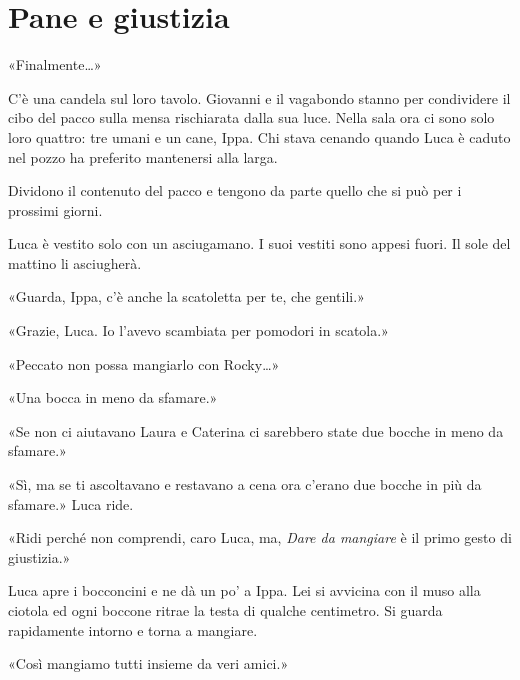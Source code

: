 \chapter{Pane e giustizia}

«Finalmente…»

\par\medskip
C’\`e una candela sul loro tavolo. Giovanni e il vagabondo stanno per condividere il cibo del pacco sulla mensa rischiarata dalla sua luce.
Nella sala ora ci sono solo loro quattro: tre umani e un cane, Ippa.
Chi stava cenando quando Luca \`e caduto nel pozzo ha preferito mantenersi alla larga.

\par\medskip
Dividono il contenuto del pacco e tengono da parte quello che si pu\`o per i prossimi giorni.

\par\medskip
Luca \`e vestito solo con un asciugamano. I suoi vestiti sono appesi fuori.  
Il sole del mattino li asciugherà.

\par\medskip
«Guarda, Ippa, c’\`e anche la scatoletta per te, che gentili.»

\par\medskip
«Grazie, Luca. Io l’avevo scambiata per pomodori in scatola.»

\par\medskip
«Peccato non possa mangiarlo con Rocky…»

\par\medskip
«Una bocca in meno da sfamare.»

\par\medskip
«Se non ci aiutavano Laura e Caterina ci sarebbero state due bocche in meno da sfamare.»

\par\medskip
«Sì, ma se ti ascoltavano e restavano a cena ora c’erano due bocche in pi\`u da sfamare.»  
Luca ride.

\par\medskip
«Ridi perch\'e non comprendi, caro Luca, ma, \textit{Dare da mangiare} \`e il primo gesto di giustizia.»

\par\medskip
Luca apre i bocconcini e ne dà un po’ a Ippa.  
Lei si avvicina con il muso alla ciotola ed ogni boccone ritrae la testa di qualche centimetro.  
Si guarda rapidamente intorno e torna a mangiare.  


\par\medskip
«Così mangiamo tutti insieme da veri amici.»

